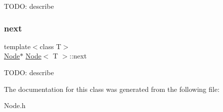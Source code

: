 T\+O\+DO\+: describe \mbox{\label{classNode_ac1c0563946c59c36bddde431b4adb00b}} 
\subsubsection{\texorpdfstring{next}{next}}
{\footnotesize\ttfamily template$<$class T$>$ \\
\hyperlink{classNode}{Node}$\ast$ \hyperlink{classNode}{Node}$<$ T $>$\+::next}

T\+O\+DO\+: describe 

The documentation for this class was generated from the following file\+:\begin{DoxyCompactItemize}
\item 
Node.\+h\end{DoxyCompactItemize}
